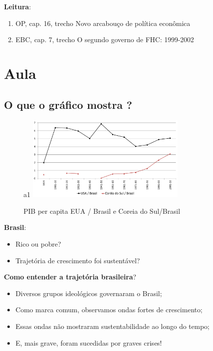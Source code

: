 \documentclass[a4paper,12pt]{article}[abntex2]
\begin{document}
\textbf{Leitura}:\begin{enumerate}
    \item OP, cap. 16, trecho Novo arcabouço de política econômica
    \item  EBC, cap. 7, trecho O segundo governo de FHC: 1999-2002
\end{enumerate}

\newpage

\section{\textbf{Aula}}

\subsection{\textbf{O que o gráfico mostra ?}}

\begin{figure}[H]
        \centering
        \caption{PIB per capita EUA / Brasil e Coreia do Sul/Brasil } 
a1        \includegraphics[width=0.7\textwidth]{Imagens/a1i1.png}
\end{figure}

\textbf{Brasil}: \begin{itemize}
    \item Rico ou pobre?
    \item Trajetória de crescimento foi sustentável?
\end{itemize}

\textbf{Como entender a trajetória brasileira}?\begin{itemize}
    \item Diversos grupos ideológicos governaram o Brasil;
    \item Como marca comum, observamos ondas fortes de crescimento;
    \item Essas ondas não mostraram sustentabilidade ao longo do tempo;
    \item E, mais grave, foram sucedidas por graves crises!
\end{itemize}
\end{document}
